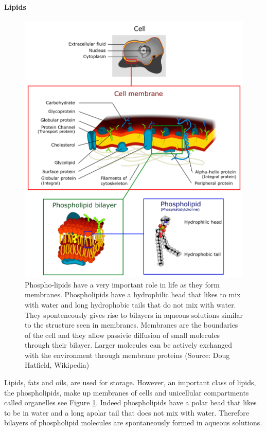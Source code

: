 \documentclass[
  11pt,
]{book}
\begin{document}
\hypertarget{lipids}{%
\paragraph{Lipids}\label{lipids}}

\begin{figure}

{\centering \includegraphics[width=0.8\linewidth]{./figs/Cell_membrane_detailed_diagram_4} 

}

\caption{Phospho-lipids have a very important role in life as they form membranes. Phospholipids have a hydrophilic head that likes to mix with water and long hydrophobic tails that do not mix with water. They sponteneously gives rise to bilayers in aqueous solutions similar to the structure seen in membranes. Membranes are the boundaries of the cell and they allow passivie diffusion of small molecules through their bilayer. Larger molecules can be actively exchanged with the environment through membrane proteins (Source: Doug Hatfield, Wikipedia)}\label{fig:lipids}
\end{figure}

Lipids, fats and oils, are used for storage. However, an important class of lipids, the phospholipids, make up membranes of cells and unicellular compartments called organelles see Figure \ref{fig:lipids}. Indeed phospholipids have a polar head that likes to be in water and a long apolar tail that does not mix with water. Therefore bilayers of phospholipid molecules are spontaneously formed in aqueous solutions.
\end{document}
